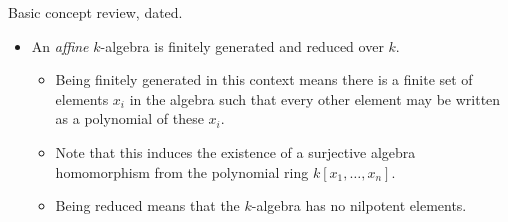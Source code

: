 \documentclass[a4paper]{article}
\begin{document}
\maketitle
Basic concept review, dated.
\begin{itemize}
    \item An \emph{affine} $k$-algebra is finitely generated and reduced over $k$.
        \begin{itemize}
            \item Being finitely generated in this context means there is a finite set of elements $x_i$ in the algebra such that every other element may be written as a polynomial of these $x_i$.
            \item Note that this induces the existence of a surjective algebra homomorphism from the polynomial ring $k[x_1,\dots,x_n]$.
            \item Being reduced means that the $k$-algebra has no nilpotent elements.
        \end{itemize}
\end{itemize}
\end{document}
